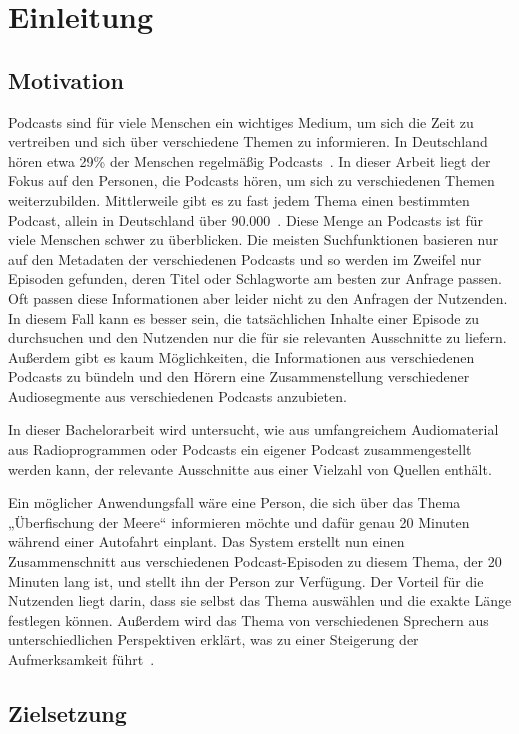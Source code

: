 \chapter{Einleitung}\label{ch:intro}

\section{Motivation}

Podcasts sind für viele Menschen ein wichtiges Medium, um sich die Zeit zu vertreiben und sich über verschiedene Themen zu informieren. 
In Deutschland hören etwa 29\% der Menschen regelmäßig Podcasts~\cite{newman2022}.
In dieser Arbeit liegt der Fokus auf den Personen, die Podcasts hören, um sich zu verschiedenen Themen weiterzubilden.
Mittlerweile gibt es zu fast jedem Thema einen bestimmten Podcast, allein in Deutschland über 90.000~\cite{listennotes}.
Diese Menge an Podcasts ist für viele Menschen schwer zu überblicken.
Die meisten Suchfunktionen basieren nur auf den Metadaten der verschiedenen Podcasts und so werden im Zweifel nur Episoden gefunden, deren Titel oder Schlagworte am besten zur Anfrage passen.
Oft passen diese Informationen aber leider nicht zu den Anfragen der Nutzenden.
In diesem Fall kann es besser sein, die tatsächlichen Inhalte einer Episode zu durchsuchen und den Nutzenden nur die für sie relevanten Ausschnitte zu liefern.
Außerdem gibt es kaum Möglichkeiten, die Informationen aus verschiedenen Podcasts zu bündeln und den Hörern eine Zusammenstellung verschiedener Audiosegmente aus verschiedenen Podcasts anzubieten.

In dieser Bachelorarbeit wird untersucht, wie aus umfangreichem Audiomaterial aus Radioprogrammen oder Podcasts ein eigener Podcast zusammengestellt werden kann, der relevante Ausschnitte aus einer Vielzahl von Quellen enthält.

Ein möglicher Anwendungsfall wäre eine Person, die sich über das Thema „Überfischung der Meere“ informieren möchte und dafür genau 20 Minuten während einer Autofahrt einplant. 
Das System erstellt nun einen Zusammenschnitt aus verschiedenen Podcast-Episoden zu diesem Thema, der 20 Minuten lang ist, und stellt ihn der Person zur Verfügung. 
Der Vorteil für die Nutzenden liegt darin, dass sie selbst das Thema auswählen und die exakte Länge festlegen können.
Außerdem wird das Thema von verschiedenen Sprechern aus unterschiedlichen Perspektiven erklärt, was zu einer Steigerung der Aufmerksamkeit führt~\cite{kang2012}.

\section{Zielsetzung}

